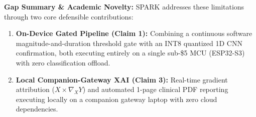 \textbf{Gap Summary \& Academic Novelty:} SPARK addresses these limitations through two core defensible contributions:
\begin{enumerate}
\item \textbf{On-Device Gated Pipeline (Claim 1):} Combining a continuous software magnitude-and-duration threshold gate with an INT8 quantized 1D CNN confirmation, both executing entirely on a single sub-\$5 MCU (ESP32-S3) with zero classification offload.
\item \textbf{Local Companion-Gateway XAI (Claim 3):} Real-time gradient attribution ($X \times \nabla_X Y$) and automated 1-page clinical PDF reporting executing locally on a companion gateway laptop with zero cloud dependencies.
\end{enumerate}

\begingroup
\small
\setlength{\tabcolsep}{3pt}
